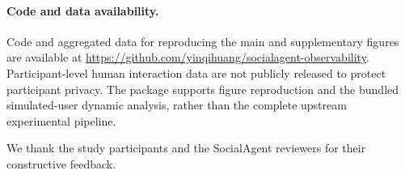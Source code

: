 \documentclass{article}
\begin{document}
\paragraph{Code and data availability.}
Code and aggregated data for reproducing the main and supplementary figures are available at \url{https://github.com/yinqihuang/socialagent-observability}. Participant-level human interaction data are not publicly released to protect participant privacy. The package supports figure reproduction and the bundled simulated-user dynamic analysis, rather than the complete upstream experimental pipeline.

\begin{ack}
We thank the study participants and the SocialAgent reviewers for their constructive feedback.
\end{ack}

\clearpage


\appendix


\end{document}
